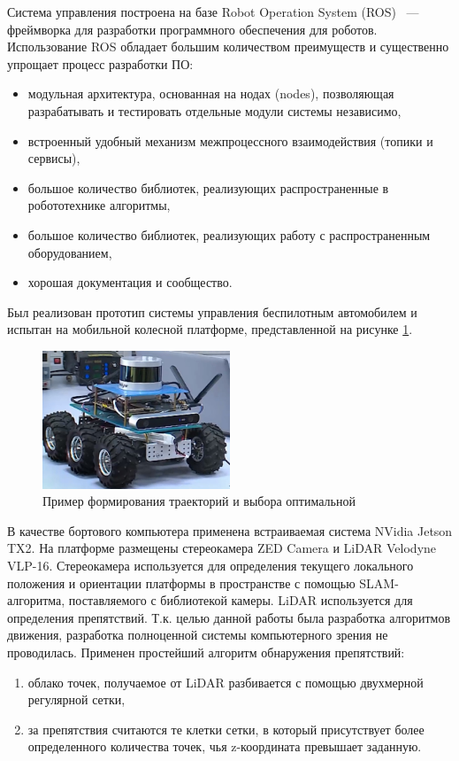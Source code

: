 Система управления построена на базе Robot Operation System (ROS) ~--- фреймворка для разработки
программного обеспечения для роботов. Использование ROS обладает большим количеством преимуществ
и существенно упрощает процесс разработки ПО:
\begin{itemize}
    \item модульная архитектура, основанная на нодах (nodes), позволяющая разрабатывать 
          и тестировать отдельные модули системы независимо,
    \item встроенный удобный механизм межпроцессного взаимодействия (топики и сервисы),
    \item большое количество библиотек, реализующих распространенные в робототехнике алгоритмы,
    \item большое количество библиотек, реализующих работу с распространенным оборудованием,
    \item хорошая документация и сообщество.
\end{itemize}

Был реализован прототип системы управления беспилотным автомобилем и испытан на мобильной
колесной платформе, представленной на рисунке \ref{img:car}.

\begin{figure}[h]
    \centering
    \includegraphics[width=0.5\textwidth]{images/car}
    \caption{Пример формирования траекторий и выбора оптимальной}
    \label{img:car}
\end{figure}

В качестве бортового компьютера применена встраиваемая система NVidia Jetson TX2. На платформе размещены
стереокамера ZED Camera и LiDAR Velodyne VLP-16. Стереокамера используется для определения текущего локального
положения и ориентации платформы в пространстве с помощью SLAM-алгоритма, поставляемого с библиотекой
камеры. LiDAR используется для определения препятствий. Т.к. целью данной работы была разработка алгоритмов
движения, разработка полноценной системы компьютерного зрения не проводилась. Применен простейший алгоритм
обнаружения препятствий:
\begin{enumerate}
    \item облако точек, получаемое от LiDAR разбивается с помощью двухмерной регулярной сетки,
    \item за препятствия считаются те клетки сетки, в который присутствует более определенного
          количества точек, чья z-координата превышает заданную.
\end{enumerate}

